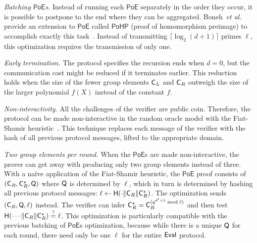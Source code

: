 \documentclass{article}
\theoremstyle{definition}
\begin{document}
\textit{Batching $\mathsf{PoE}$s.} Instead of running each $\mathsf{PoE}$ separately in the order they occur, it is possible to postpone to the end where they can be aggregated. Boneh~\emph{et al.} provide an extension to $\mathsf{PoE}$ called $\mathsf{PoHP}$ (proof of homomorphism preimage) to accomplish exactly this task~\cite[\S A.1]{C:BonBunFis19}. Instead of transmitting $\lceil \log_2(d + 1)\rceil $ primes $\ell$, this optimization requires the transmission of only one.

\textit{Early termination.} The protocol specifies the recursion ends when $d=0$, but the communication cost might be reduced if it terminates earlier. This reduction holds when the size of the fewer group elements $\mathsf{C}_L$ and $\mathsf{C}_R$ outweigh the size of the larger polynomial $f(X)$ instead of the constant $f$.

\textit{Non-interactivity.} All the challenges of the verifier are public coin. Therefore, the protocol can be made non-interactive in the random oracle model with the Fiat-Shamir heuristic~\cite{C:FiaSha86}. This technique replaces each message of the verifier with the hash of all previous protocol messages, lifted to the appropriate domain.

\textit{Two group elements per round.} When the $\mathsf{PoE}$s are made non-interactive, the prover can get away with producing only two group elements instead of three. With a naïve application of the Fiat-Shamir heuristic, the $\mathsf{PoE}$ proof consists of $(\mathsf{C}_R, \mathsf{C}_R^\star, \mathsf{Q})$ where $\mathsf{Q}$ is determined by $\ell$, which in turn is determined by hashing all previous protocol messages: $\ell \gets \mathsf{H}(\cdot \Vert \mathsf{C}_R \Vert \mathsf{C}_R^\star)$. The optimization sends $(\mathsf{C}_R, \mathsf{Q}, \ell)$ instead. The verifier can infer $\mathsf{C}_R^\star = \mathsf{C}_R^{(q^{d'+1} \bmod \ell)}$ and then test $\mathsf{H}(\cdots \Vert \mathsf{C}_R \Vert \mathsf{C}_R^\star) \stackrel{?}{=} \ell$. This optimization is particularly compatible with the previous batching of $\mathsf{PoE}$s optimization, because while there is a unique $\mathsf{Q}$ for each round, there need only be one $\ell$ for the entire $\textsf{{Eval}}$ protocol.
\end{document}
